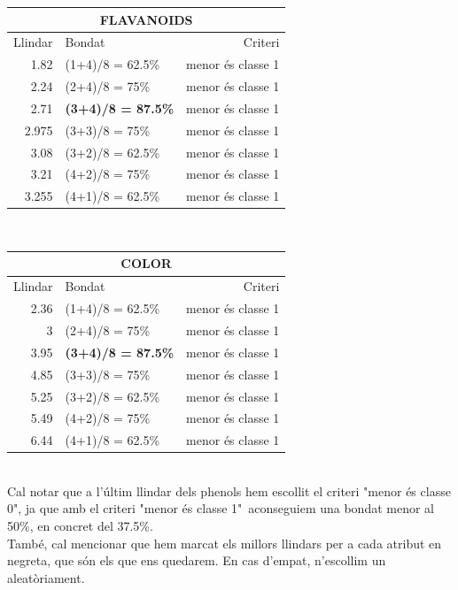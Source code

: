 \documentclass{article} %
\begin{document}
{	{\selectfont\small
	\begin{tabular}{r | l | r}
	 	\multicolumn{3}{c}{FLAVANOIDS} \\ \hline
	 	Llindar & Bondat & Criteri \\ \hline
		1.82  & (1+4)/8 = 62.5\% & menor és classe 1 \\
		2.24  & (2+4)/8 = 75\% & menor és classe 1 \\
		2.71  & \textbf{(3+4)/8 = 87.5\%} & menor és classe 1 \\
		2.975 & (3+3)/8 = 75\% & menor és classe 1 \\
		3.08  & (3+2)/8 = 62.5\% & menor és classe 1 \\
		3.21  & (4+2)/8 = 75\% & menor és classe 1 \\
		3.255 & (4+1)/8 = 62.5\% & menor és classe 1 \\
	\end{tabular}
	} \\
	
	{\selectfont\small
	\begin{tabular}{r | l | r}
	 	\multicolumn{3}{c}{COLOR} \\ \hline
	 	Llindar & Bondat & Criteri \\ \hline
		2.36 & (1+4)/8 = 62.5\% & menor és classe 1 \\
		3    & (2+4)/8 = 75\% & menor és classe 1 \\
		3.95 & \textbf{(3+4)/8 = 87.5\%} & menor és classe 1 \\
		4.85 & (3+3)/8 = 75\% & menor és classe 1 \\
		5.25 & (3+2)/8 = 62.5\% & menor és classe 1 \\
		5.49 & (4+2)/8 = 75\% & menor és classe 1 \\
		6.44 & (4+1)/8 = 62.5\% & menor és classe 1 \\
	\end{tabular}
	} \\

	Cal notar que a l'últim llindar dels phenols hem escollit el criteri "menor és classe 0", ja que amb el criteri "menor és classe 1"\ aconseguiem una bondat menor al 50\%, en concret del 37.5\%. \\

	També, cal mencionar que hem marcat els millors llindars per a cada atribut en negreta, que són els que ens quedarem. En cas d'empat, n'escollim un aleatòriament. \\

}
\end{document}
